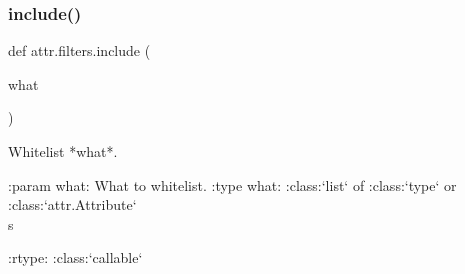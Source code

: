 \subsubsection{\texorpdfstring{include()}{include()}}
{\footnotesize\ttfamily def attr.\+filters.\+include (\begin{DoxyParamCaption}\item[{}]{what }\end{DoxyParamCaption})}

\begin{DoxyVerb}Whitelist *what*.

:param what: What to whitelist.
:type what: :class:`list` of :class:`type` or :class:`attr.Attribute`\\ s

:rtype: :class:`callable`
\end{DoxyVerb}
 